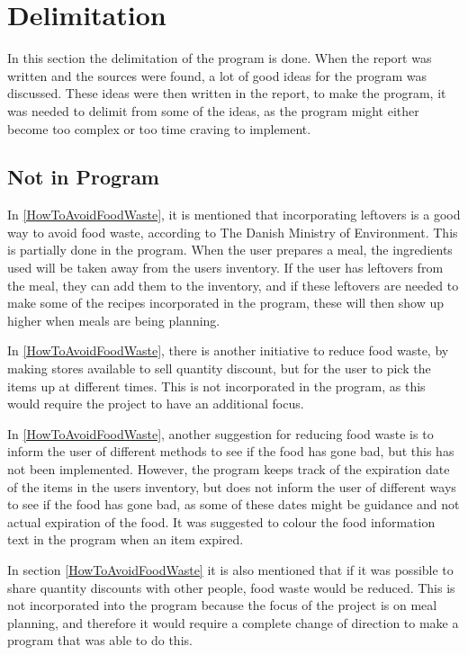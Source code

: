 \chapter{Delimitation}

In this section the delimitation of the program is done. When the report was written and the sources were found, a lot of good ideas for the program was discussed. These ideas were then written in the report, to make the program, it was needed to delimit from some of the ideas, as the program might either become too complex or too time craving to implement.

\section{Not in Program}\label{DelimitationSection}

In \cref{HowToAvoidFoodWaste}, it is mentioned that incorporating leftovers is a good way to avoid food waste, according to The Danish Ministry of Environment. This is partially done in the program. When the user prepares a meal, the ingredients used will be taken away from the users inventory. If the user has leftovers from the meal, they can add them to the inventory, and if these leftovers are needed to make some of the recipes incorporated in the program, these will then show up higher when meals are being planning.

In \cref{HowToAvoidFoodWaste}, there is another initiative to reduce food waste, by making stores available to sell quantity discount, but for the user to pick the items up at different times. This is not incorporated in the program, as this would require the project to have an additional focus.

In \cref{HowToAvoidFoodWaste}, another suggestion for reducing food waste is to inform the user of different methods to see if the food has gone bad, but this has not been implemented. However, the program keeps track of the expiration date of the items in the users inventory, but does not inform the user of different ways to see if the food has gone bad, as some of these dates might be guidance and not actual expiration of the food. It was suggested to colour the food information text in the program when an item expired.

In section \ref{HowToAvoidFoodWaste} it is also mentioned that if it was possible to share quantity discounts with other people, food waste would be reduced. This is not incorporated into the program because the focus of the project is on meal planning, and therefore it would require a complete change of direction to make a program that was able to do this.

